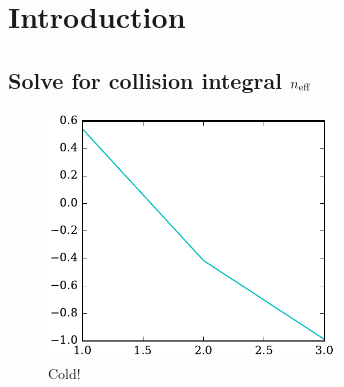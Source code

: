 \documentclass[journal = jceaax, manuscript=suppinfo]{achemso}
\title{\papertitle}
\begin{document}
\maketitle

\tableofcontents

\clearpage

\section{Introduction}

\subsection{Solve for collision integral $n_{\rm eff}$}
\label{sec:CIneff}

\begin{figure}[H]
    \caption{Cold! \label{fig:cold}}
    \includegraphics[width=3in]{cold}
    \end{figure}
\end{document}
